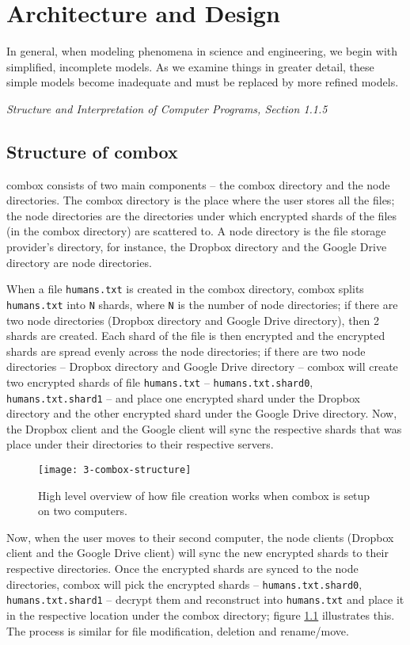 \chapter{Architecture and Design}

\epigraph{In general, when modeling phenomena in science and
  engineering, we begin with simplified, incomplete models. As we
  examine things in greater detail, these simple models become
  inadequate and must be replaced by more refined
  models.}{\textit{Structure and Interpretation of Computer Programs,
    Section 1.1.5}\cite{sicp}}

\section{Structure of combox}

combox consists of two main components -- the combox directory and the
node directories. The combox directory is the place where the user
stores all the files; the node directories are the directories under
which encrypted shards of the files (in the combox directory) are
scattered to. A node directory is the file storage provider's
directory, for instance, the Dropbox directory and the Google Drive
directory are node directories.

When a file \verb+humans.txt+ is created in the combox directory,
combox splits \verb+humans.txt+ into \verb+N+ shards, where \verb+N+
is the number of node directories; if there are two node directories
(Dropbox directory and Google Drive directory), then 2 shards are
created. Each shard of the file is then encrypted and the encrypted
shards are spread evenly across the node directories; if there are two
node directories -- Dropbox directory and Google Drive directory --
combox will create two encrypted shards of file \verb+humans.txt+ --
\verb+humans.txt.shard0+, \verb+humans.txt.shard1+ -- and place one
encrypted shard under the Dropbox directory and the other encrypted
shard under the Google Drive directory. Now, the Dropbox client and
the Google client will sync the respective shards that was place under
their directories to their respective servers.

\begin{figure}[h]
\texttt{[image: 3-combox-structure]}
\caption{High level overview of how file creation works when combox is
  setup on two computers.}
\label{fig:3-combox-structure}
\end{figure}

Now, when the user moves to their second computer, the node clients
(Dropbox client and the Google Drive client) will sync the new
encrypted shards to their respective directories. Once the encrypted
shards are synced to the node directories, combox will pick the
encrypted shards -- \verb+humans.txt.shard0+, \verb+humans.txt.shard1+
-- decrypt them and reconstruct into \verb+humans.txt+ and place it in
the respective location under the combox directory; figure
\ref{fig:3-combox-structure} illustrates this. The process is similar
for file modification, deletion and rename/move.

